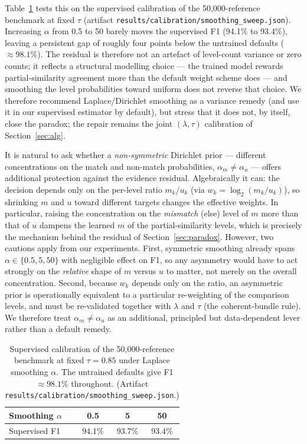 \documentclass[11pt]{article}
\begin{document}
Table~\ref{tab:smooth} tests this on the supervised calibration of the 50{,}000-reference
benchmark at fixed $\tau$ (artifact \texttt{results/calibration/smoothing\_sweep.json}).
Increasing $\alpha$ from 0.5 to 50 barely moves the supervised
F1 (94.1\% to 93.4\%), leaving a persistent gap of roughly four points below the untrained
defaults ($\approx98.1\%$). The residual is therefore not an artefact of level-count variance
or zero counts; it reflects a structural modelling choice --- the trained model rewards
partial-similarity agreement more than the default weight scheme does --- and smoothing the
level probabilities toward uniform does not reverse that choice. We therefore recommend
Laplace/Dirichlet smoothing as a variance remedy (and use it in our supervised estimator by
default), but stress that it does not, by itself, close the paradox; the repair remains the
joint $(\lambda,\tau)$ calibration of Section~\ref{sec:alg}.

It is natural to ask whether a \emph{non-symmetric} Dirichlet prior --- different
concentrations on the match and non-match probabilities, $\alpha_m\neq\alpha_u$ --- offers
additional protection against the evidence residual. Algebraically it can: the decision
depends only on the per-level ratio $m_k/u_k$ (via $w_k=\log_2(m_k/u_k)$), so shrinking
$m$ and $u$ toward different targets changes the effective weights. In particular, raising
the concentration on the \emph{mismatch} (else) level of $m$ more than that of $u$ dampens
the learned $m$ of the partial-similarity levels, which is precisely the mechanism behind the
residual of Section~\ref{sec:paradox}. However, two cautions apply from our experiments.
First, symmetric smoothing already spans $\alpha\in\{0.5,5,50\}$ with negligible effect on
F1, so any asymmetry would have to act strongly on the \emph{relative} shape of $m$ versus
$u$ to matter, not merely on the overall concentration. Second, because $w_k$ depends only
on the ratio, an asymmetric prior is operationally equivalent to a particular re-weighting of
the comparison levels, and must be re-validated together with $\lambda$ and $\tau$ (the
coherent-bundle rule). We therefore treat $\alpha_m\neq\alpha_u$ as an additional, principled
but data-dependent lever rather than a default remedy.

\begin{table}[h]
\centering
\caption{Supervised calibration of the 50{,}000-reference benchmark at fixed
$\tau=0.85$ under Laplace smoothing $\alpha$. The untrained defaults give F1
$\approx98.1\%$ throughout. (Artifact \texttt{results/calibration/smoothing\_sweep.json}.)}
\label{tab:smooth}
\begin{tabular}{lccc}
\toprule
Smoothing $\alpha$ & 0.5 & 5 & 50 \\
\midrule
Supervised F1 & 94.1\% & 93.7\% & 93.4\% \\
\bottomrule
\end{tabular}
\end{table}
\end{document}
